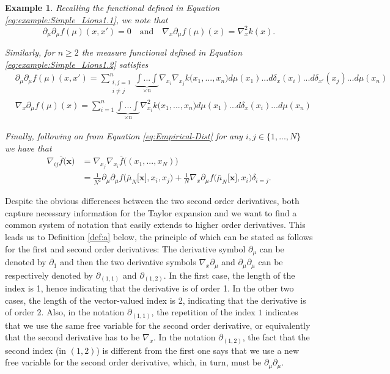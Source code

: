 \documentclass[a4paper,11pt,twoside]{article}
\numberwithin{equation}{section}
\theoremstyle{plain}
\newtheorem{example}[theorem]{Example}
\newcommand{\1}{\mathbbm{1}}
\begin{document}
	\begin{example}
		\label{example:Simple_Lions2}
		Recalling the functional defined in Equation \eqref{eq:example:Simple_Lions1.1}, we note that
		$$
		\partial_\mu \partial_\mu f( \mu)(x, x') = 0 
		\quad \mbox{and}\quad
		\nabla_{x} \partial_\mu f( \mu)(x) = \nabla_x^2 k(x). 
		$$
		
		Similarly, for $n\geq 2$ the measure functional defined in Equation \eqref{eq:example:Simple_Lions1.2} satisfies
		\begin{align*}
			&\partial_\mu \partial_\mu f( \mu)(x, x') 
			= 
			\sum_{\substack{i, j=1 \\ i\neq j}}^{n} \underbrace{\int ... \int}_{\times n} \nabla_{x_i} \nabla_{x_j} k \Big( x_1, ..., x_n \Big) d\mu(x_1) ... d \delta_{x}(x_i) ... d\delta_{x'}(x_j) ...d\mu(x_n)
			\\
			&\nabla_x \partial_\mu f( \mu)(x) 
			= 
			\sum_{i=1}^n \underbrace{\int ... \int}_{\times n} \nabla_{x_i}^2 k \Big( x_1, ..., x_n\Big) d\mu(x_1)... d\delta_{x}(x_i) ... d\mu(x_n)
		\end{align*}
		
		Finally, following on from Equation \eqref{eq:Empirical-Dist} for any $i, j\in \{1, ..., N\}$ we have that 
		\begin{align}
			\nonumber
			\nabla_{ij} \overline{f} \big( \boldsymbol{x} \big) &= \nabla_{x_j} \nabla_{x_i} \overline{f}\big( (x_1, ..., x_N) \big) 
			\\
			\label{eq:Empirical-2Deriv}
			&= \tfrac{1}{N^2} \partial_\mu \partial_\mu f\Big( \bar{\mu}_N\big[ \boldsymbol{x} \big], x_i, x_j \Big) + \tfrac{1}{N} \nabla_{x} \partial_\mu f\Big( \bar{\mu}_N\big[ \boldsymbol{x} \big] , x_i \Big) \delta_{i=j}. 
		\end{align}
	\end{example}
	
	Despite the obvious differences between the two second order derivatives, both capture necessary information for the Taylor expansion and we want to find a common system of notation that easily extends to higher order derivatives. This leads us to Definition \ref{def:a} below, the principle of which can be stated as follows for the first and second order derivatives: The derivative symbol $\partial_{\mu}$ can be denoted by $\partial_{1}$ and then the two derivative symbols $\nabla_{x} \partial_{\mu}$ and $\partial_{\mu} \partial_{\mu}$ can be respectively denoted by $\partial_{(1,1)}$ and $\partial_{(1,2)}$. In the first case, the length of the index is 1, hence indicating that the derivative is of order 1. In the other two cases, the length of the vector-valued index is 2, indicating that the derivative is of order 2. Also, in the notation $\partial_{(1,1)}$, the repetition of the index $1$ indicates that we use the same free variable for the second order derivative, or equivalently that the second derivative has to be $\nabla_{x}$. In the notation $\partial_{(1,2)}$, the fact that the second index (in $(1,2)$) is different from the first one says that we use a new free variable for the second order derivative, which, in turn, must be $\partial_{\mu} \partial_{\mu}$. 
	
\end{document}
